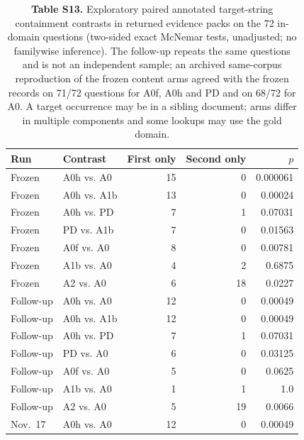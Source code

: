 \begin{table}
\centering\small
\caption{\textbf{Table S13.} Exploratory paired annotated target-string containment contrasts in
returned evidence packs on the 72 in-domain questions (two-sided exact
McNemar tests, unadjusted; no familywise inference). The follow-up repeats the
same questions and is not an independent sample; an archived same-corpus
reproduction of the frozen content arms agreed with the frozen records on
71/72 questions for A0f, A0h and PD and on 68/72 for A0. A target occurrence
may be in a sibling document; arms differ in multiple components and some
lookups may use the gold domain.}

\begin{tabular}{llrrr}
\toprule
Run & Contrast & First only & Second only & $p$ \\
\midrule
Frozen & A0h vs. A0 & 15 & 0 & 0.000061 \\
Frozen & A0h vs. A1b & 13 & 0 & 0.00024 \\
Frozen & A0h vs. PD & 7 & 1 & 0.07031 \\
Frozen & PD vs. A1b & 7 & 0 & 0.01563 \\
Frozen & A0f vs. A0 & 8 & 0 & 0.00781 \\
Frozen & A1b vs. A0 & 4 & 2 & 0.6875 \\
Frozen & A2 vs. A0 & 6 & 18 & 0.0227 \\
Follow-up & A0h vs. A0 & 12 & 0 & 0.00049 \\
Follow-up & A0h vs. A1b & 12 & 0 & 0.00049 \\
Follow-up & A0h vs. PD & 7 & 1 & 0.07031 \\
Follow-up & PD vs. A0 & 6 & 0 & 0.03125 \\
Follow-up & A0f vs. A0 & 5 & 0 & 0.0625 \\
Follow-up & A1b vs. A0 & 1 & 1 & 1.0 \\
Follow-up & A2 vs. A0 & 5 & 19 & 0.0066 \\
Nov.\ 17 & A0h vs. A0 & 12 & 0 & 0.00049 \\
\bottomrule
\end{tabular}
\end{table}

